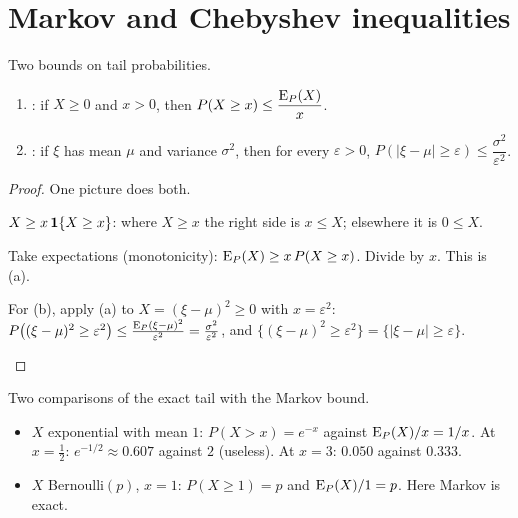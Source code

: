 \section{Markov and Chebyshev inequalities}

\begin{theorem}
\label{thm:markov}
Two bounds on tail probabilities.
\begin{enumerate}[label=(\alph*)]
  \item {}: if $X\ge0$ and $x>0$, then $P(X\ge x)\le\dfrac{\operatorname{E}_P(X)}{x}$.
  \item {}: if $\xi$ has mean $\mu$ and variance $\sigma^2$, then for every $\varepsilon>0$, $P(|\xi-\mu|\ge\varepsilon)\le\dfrac{\sigma^2}{\varepsilon^2}$.
\end{enumerate}
\end{theorem}
\begin{proof}
One picture does both.
\begin{steps}
  \item $X\ge x\,\mathbf{1}\{X\ge x\}$: where $X\ge x$ the right side is $x\le X$; elsewhere it is $0\le X$.
  \item Take expectations (monotonicity): $\operatorname{E}_P(X)\ge x\,P(X\ge x)$. Divide by $x$. This is (a).
  \item For (b), apply (a) to $X=(\xi-\mu)^2\ge0$ with $x=\varepsilon^2$: $P\big((\xi-\mu)^2\ge\varepsilon^2\big)\le\frac{\operatorname{E}_P(\xi-\mu)^2}{\varepsilon^2}=\frac{\sigma^2}{\varepsilon^2}$, and $\{(\xi-\mu)^2\ge\varepsilon^2\}=\{|\xi-\mu|\ge\varepsilon\}$. \qedhere
\end{steps}
\end{proof}

\begin{example}
\label{ex:markov}
Two comparisons of the exact tail with the Markov bound.
\begin{itemize}
  \item $X$ exponential with mean $1$: $P(X>x)=e^{-x}$ against $\operatorname{E}_P(X)/x=1/x$. At $x=\frac12$: $e^{-1/2}\approx0.607$ against $2$ (useless). At $x=3$: $0.050$ against $0.333$.
  \item $X$ Bernoulli$(p)$, $x=1$: $P(X\ge1)=p$ and $\operatorname{E}_P(X)/1=p$. Here Markov is exact.
\end{itemize}
\end{example}

\begin{pic}
\end{pic}

